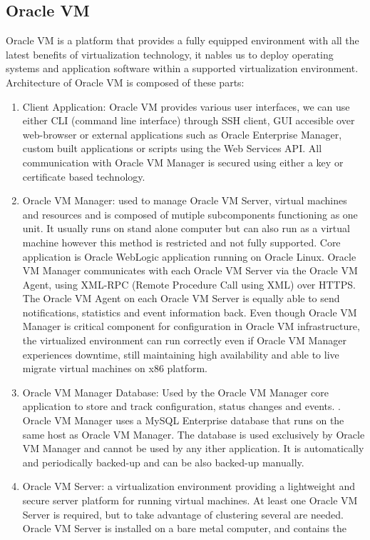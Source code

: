 \begin{enumerate}
\subsection{Oracle VM}
Oracle VM is a platform that provides a fully equipped environment with all the latest benefits of virtualization technology, it nables us to deploy operating systems and application software within a supported virtualization environment.
Architecture of Oracle VM is composed of these parts:
\begin{enumerate}
\item Client Application: Oracle VM provides various user interfaces, we can use either CLI (command line interface) through SSH client, GUI accesible over web-browser or external applications such as Oracle Enterprise Manager, custom built applications or scripts using the Web Services API. All communication with Oracle VM Manager is secured using either a key or certificate based technology.
\item Oracle VM Manager: used to manage Oracle VM Server, virtual machines and resources and is composed of mutiple subcomponents functioning as one unit. It usually runs on stand alone computer but can also run as a virtual machine however this method is restricted and not fully supported. Core application is Oracle WebLogic application running on Oracle Linux. Oracle VM Manager communicates with each Oracle VM Server via the Oracle VM Agent, using XML-RPC (Remote Procedure Call using XML) over HTTPS.  The Oracle VM Agent on each Oracle VM Server is equally able to send notifications, statistics and event information back. Even though Oracle VM Manager is critical component for configuration in Oracle VM infrastructure, the virtualized environment can run correctly even if Oracle VM Manager experiences downtime, still maintaining high availability and able to live migrate virtual machines on x86 platform.
\item Oracle VM Manager Database:  Used by the Oracle VM Manager core application to store and track configuration, status changes and events. . Oracle VM Manager uses a MySQL Enterprise database that runs on the same host as Oracle VM Manager. The database is used exclusively by Oracle VM Manager and cannot be used by any ither application. It is automatically and periodically backed-up and can be also backed-up manually.
\item Oracle VM Server: a virtualization environment providing a lightweight and secure server platform for running virtual machines. At least one Oracle VM Server is required, but to take advantage of clustering several are needed. Oracle VM Server is installed on a bare metal computer, and contains the 

\end{enumerate}
\end{enumerate}
